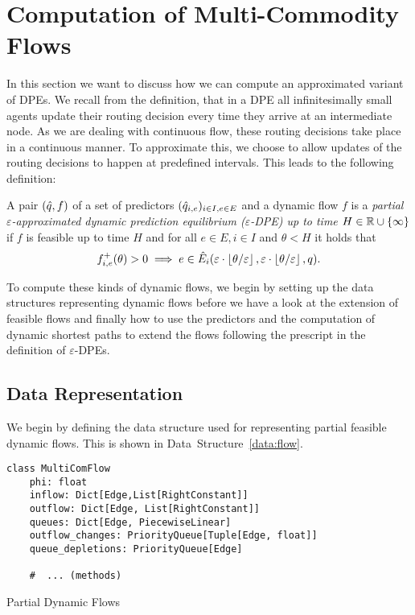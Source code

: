 \section{Computation of Multi-Commodity Flows}

In this section we want to discuss how we can compute an approximated variant of DPEs.
We recall from the definition, that in a DPE all infinitesimally small agents update their routing decision every time they arrive at an intermediate node.
As we are dealing with continuous flow, these routing decisions take place in a continuous manner.
To approximate this, we choose to allow updates of the routing decisions to happen at predefined intervals.
This leads to the following definition:

\begin{definition}
    A pair $(\hat q, f)$ of a set of predictors $(\hat q_{i,e})_{i\in I, e\in E}$ and a dynamic flow $f$ is a \emph{partial $\varepsilon$-approximated dynamic prediction equilibrium ($\varepsilon$-DPE) up to time $H\in\mathbb{R}\cup\{\infty\}$} if $f$ is feasible up to time $H$ and for all $e\in E, i\in I$ and $\theta < H$ it holds that
    \[
        {f}^+_{i,e}(\theta) > 0 \implies e \in \hat E_i(\varepsilon\cdot \left\lfloor{\theta / \varepsilon}\right\rfloor, \varepsilon\cdot \left\lfloor{\theta / \varepsilon}\right\rfloor, q).
    \]
\end{definition}

To compute these kinds of dynamic flows, we begin by setting up the data structures representing dynamic flows before we have a look at the extension of feasible flows and finally how to use the predictors and the computation of dynamic shortest paths to extend the flows following the prescript in the definition of $\varepsilon$-DPEs.


\subsection{Data Representation}

We begin by defining the data structure used for representing partial feasible dynamic flows.
This is shown in Data~Structure~\ref{data:flow}.


\begin{classdef}
    \begin{verbatim}
class MultiComFlow
    phi: float
    inflow: Dict[Edge,List[RightConstant]]
    outflow: Dict[Edge, List[RightConstant]]
    queues: Dict[Edge, PiecewiseLinear]
    outflow_changes: PriorityQueue[Tuple[Edge, float]]
    queue_depletions: PriorityQueue[Edge]

    #  ... (methods)
\end{verbatim}
    \caption{Partial Dynamic Flows}
    \label{data:flow}
\end{classdef}

